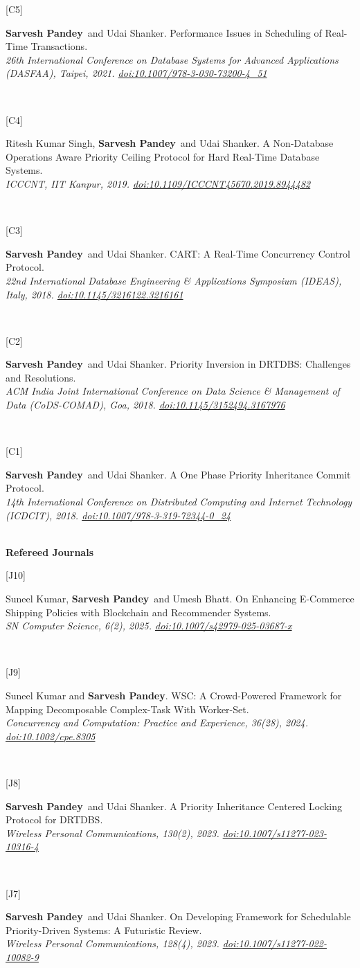 \documentclass[11pt,a4paper]{article}
\newcommand{\me}{\textbf{Sarvesh Pandey}}
\newcommand{\pub}[3]{%
  \begin{minipage}[t]{0.045\textwidth}\raggedright\small #1\end{minipage}%
  \begin{minipage}[t]{0.945\textwidth}#2\\{\small\itshape #3}\end{minipage}\\[0.34em]%
}
\begin{document}
\pub{[C5]}{\me\ and Udai Shanker. Performance Issues in Scheduling of Real-Time Transactions.}{26th International Conference on Database Systems for Advanced Applications (DASFAA), Taipei, 2021. \href{https://doi.org/10.1007/978-3-030-73200-4_51}{doi:10.1007/978-3-030-73200-4\_51}}

\pub{[C4]}{Ritesh Kumar Singh, \me\ and Udai Shanker. A Non-Database Operations Aware Priority Ceiling Protocol for Hard Real-Time Database Systems.}{ICCCNT, IIT Kanpur, 2019. \href{https://doi.org/10.1109/ICCCNT45670.2019.8944482}{doi:10.1109/ICCCNT45670.2019.8944482}}

\pub{[C3]}{\me\ and Udai Shanker. CART: A Real-Time Concurrency Control Protocol.}{22nd International Database Engineering \& Applications Symposium (IDEAS), Italy, 2018. \href{https://doi.org/10.1145/3216122.3216161}{doi:10.1145/3216122.3216161}}

\pub{[C2]}{\me\ and Udai Shanker. Priority Inversion in DRTDBS: Challenges and Resolutions.}{ACM India Joint International Conference on Data Science \& Management of Data (CoDS-COMAD), Goa, 2018. \href{https://doi.org/10.1145/3152494.3167976}{doi:10.1145/3152494.3167976}}

\pub{[C1]}{\me\ and Udai Shanker. A One Phase Priority Inheritance Commit Protocol.}{14th International Conference on Distributed Computing and Internet Technology (ICDCIT), 2018. \href{https://doi.org/10.1007/978-3-319-72344-0_24}{doi:10.1007/978-3-319-72344-0\_24}}

\vspace{0.4em}
\textbf{\small Refereed Journals}\\[0.45em]

\pub{[J10]}{Suneel Kumar, \me\ and Umesh Bhatt. On Enhancing E-Commerce Shipping Policies with Blockchain and Recommender Systems.}{SN Computer Science, 6(2), 2025. \href{https://doi.org/10.1007/s42979-025-03687-x}{doi:10.1007/s42979-025-03687-x}}

\pub{[J9]}{Suneel Kumar and \me. WSC: A Crowd-Powered Framework for Mapping Decomposable Complex-Task With Worker-Set.}{Concurrency and Computation: Practice and Experience, 36(28), 2024. \href{https://doi.org/10.1002/cpe.8305}{doi:10.1002/cpe.8305}}

\pub{[J8]}{\me\ and Udai Shanker. A Priority Inheritance Centered Locking Protocol for DRTDBS.}{Wireless Personal Communications, 130(2), 2023. \href{https://doi.org/10.1007/s11277-023-10316-4}{doi:10.1007/s11277-023-10316-4}}

\pub{[J7]}{\me\ and Udai Shanker. On Developing Framework for Schedulable Priority-Driven Systems: A Futuristic Review.}{Wireless Personal Communications, 128(4), 2023. \href{https://doi.org/10.1007/s11277-022-10082-9}{doi:10.1007/s11277-022-10082-9}}
\end{document}
